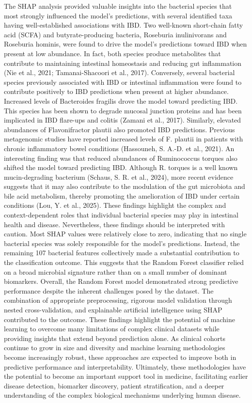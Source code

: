 \documentclass[twoside,twocolumn,10pt]{article}
\begin{document}
The SHAP analysis provided valuable insights into the bacterial species that most strongly influenced the model's predictions, with several identified taxa having well-established associations with IBD. Two well-known short-chain fatty acid (SCFA) and butyrate-producing bacteria, Roseburia inulinivorans and Roseburia hominis, were found to drive the model's predictions toward IBD when present at low abundance. In fact, both species produce metabolites that contribute to maintaining intestinal homeostasis and reducing gut inflammation (Nie et al., 2021; Tamanai-Shacoori et al., 2017). 
Conversely, several bacterial species previously associated with IBD or intestinal inflammation were found to contribute positively to IBD predictions when present at higher abundance. Increased levels of Bacteroides fragilis drove the model toward predicting IBD. This species has been shown to degrade mucosal junction proteins and has been implicated in IBD flare-ups and colitis (Zamani et al., 2017). Similarly, elevated abundances of Flavonifractor plautii also promoted IBD predictions. Previous metagenomic studies have reported increased levels of F. plautii in patients with chronic inflammatory bowel conditions (Hassouneh, S. A.-D. et al., 2021).
An interesting finding was that reduced abundances of Ruminococcus torques also shifted the model toward predicting IBD. Although R. torques is a well known mucin-degrading bacterium (Schaus, S. R. et al., 2024), more recent evidence suggests that it may also contribute to the modulation of the gut microbiota and bile acid metabolism, thereby promoting the amelioration of IBD under certain conditions (Lou, Y. et al., 2025). These findings highlight the complex and context-dependent roles that individual bacterial species may play in intestinal health and disease. 
Nevertheless, these findings should be interpreted with caution. Most SHAP values were relatively close to zero, indicating that no single bacterial species was solely responsible for the model's predictions. Instead, the remaining 107 bacterial features collectively made a substantial contribution to the classification outcome. This suggests that the Random Forest classifier relied on a broad microbial signature rather than on a small number of dominant biomarkers.
Overall, the Random Forest model demonstrated strong predictive performance despite the inherent challenges posed by the dataset. The combination of appropriate preprocessing, rigorous model validation through nested cross-validation, and explainable artificial intelligence using SHAP contributed to the outcome. These findings highlight the potential of machine learning to overcome many limitations of complex clinical datasets while providing insights that extend beyond prediction alone. As clinical cohorts continue to grow in size and diversity and machine learning methodologies become increasingly robust, these approaches are expected to improve both in predictive performance and interpretability. Ultimately, these methodologies have the potential to become an important support tool in medicine, facilitating earlier disease detection, biomarker discovery, patient stratification, and a deeper understanding of the complex biological mechanisms underlying human disease.
\end{document}
